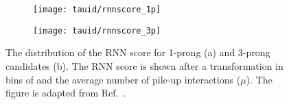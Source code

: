 \begin{figure}[htbp]
  \centering

  \begin{subfigure}{0.498\textwidth}
    \texttt{[image: tauid/rnnscore\_1p]}
    \subcaption{}
  \end{subfigure}\hfill%
  \begin{subfigure}{0.498\textwidth}
    \texttt{[image: tauid/rnnscore\_3p]}
    \subcaption{}
  \end{subfigure}

  \caption{The distribution of the RNN score for 1-prong (a) and
    3-prong \tauhadvis candidates (b). The RNN score is shown after a
    transformation in bins of \tauhadvis \pT and the average number of
    pile-up interactions ($\mu$). The figure is adapted from
    Ref.~\cite{ATL-PHYS-PUB-2019-033}.}%
  \label{fig:flattened_rnnscore}
\end{figure}

